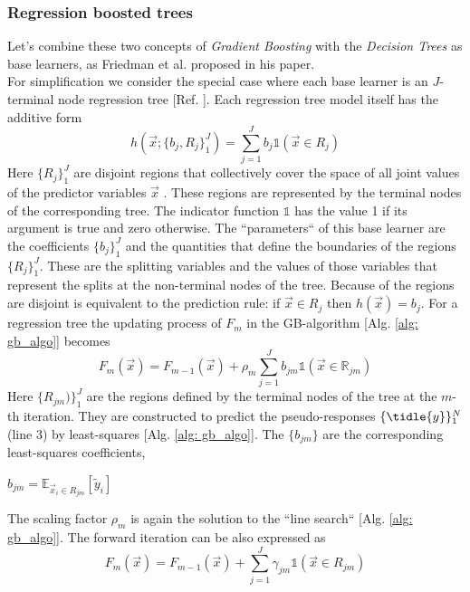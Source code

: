 \documentclass[12pt, a4paper]{article}
\begin{document}
\subsubsection{Regression boosted trees}
\label{sec: regr_boosted_trees}
Let's combine these two concepts of \textit{Gradient Boosting} with the \textit{Decision Trees} as base learners, as Friedman et al. \cite{Friedman2001} proposed in his paper. \\
For simplification we consider the special case where each base learner is an $J$-terminal node regression tree [Ref. \cite{Breiman1984}]. Each regression tree model itself has the additive form 
\begin{equation}
    h(\vec{x};\{b_j,R_j\}_1^J) = \sum_{j=1}^J b_j \mathds{1}(\vec{x} \in R_j)
\end{equation}
Here $\{R_j\}_1^J$ are disjoint regions that collectively cover the space of all joint values of the predictor variables $\vec{x}$ \cite{Friedman2001}. These regions are represented by the terminal nodes of the corresponding tree. The indicator function $\mathds{1}$ has the value 1 if its argument is true and zero otherwise. The ``parameters`` of this base learner are the coefficients $\{b_j\}_1^J$ and the quantities that define the boundaries of the regions $\{R_j\}_1^J$. These are the splitting variables and the values of those variables that represent the splits at the non-terminal nodes of the tree. Because of the regions are disjoint is equivalent to the prediction rule: if $\vec{x} \in R_j$
then $h(\vec{x}) = b_j$.
For a regression tree the updating process of $F_m$ in the GB-algorithm [Alg. \ref{alg: gb_algo}] becomes
\begin{equation}
    F_m(\vec{x}) = F_{m-1}(\vec{x}) + \rho_m \sum_{j=1}^J b_{jm} \mathds{1}(\vec{x} \in \mathbb{R}_{jm})
\end{equation}
Here $\{R_{jm})\}_1^J$ are the regions defined by the terminal nodes of the tree at the $m$-th iteration. They are constructed to predict the pseudo-responses $\{\tidle{y}\}_1^N$ (line 3) by least-squares [Alg. \ref{alg: gb_algo}]. The $\{b_{jm}\}$ are the corresponding least-squares coefficients,
\begin{center}
    $b_{jm} = \mathbb{E}_{\vec{x}_i \in R_{jm}}[\tilde{y}_i]$
\end{center}
The scaling factor $\rho_m$ is again the solution to the ``line search`` [Alg. \ref{alg: gb_algo}].
The forward iteration can be also expressed as 
\begin{equation}
        F_m(\vec{x}) = F_{m-1}(\vec{x}) + \sum_{j=1}^J \gamma_{jm} \mathds{1}(\vec{x} \in R_{jm})
\end{equation}
\end{document}
